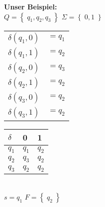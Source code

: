 \documentclass[
	final,
	a4paper,
	oneside,
	parskip=full,
	headings=standardclasses,
	headings=big,
	pointednumbers
]{scrartcl}
\def\myident{3cm}
\def\mysep{0pt}
\def\myrule{0pt}
\newenvironment{MyBsp}
[2]
{%
    \setlength{\fboxsep}{\mysep}
    \setlength{\fboxrule}{\myrule}
    \hspace{-\myident}\fbox{\begin{minipage}[t]{\myident}\hfill\textbf{#2}\enskip\,\end{minipage}}\begin{lrbox}{\mybox}\begin{minipage}[t]{\textwidth}\vspace{#1}
}
{%
    \end{minipage}\end{lrbox}\fbox{\usebox{\mybox}}
}
\begin{document}
    \begin{MyBsp}{-0.26cm}{Bsp.}
        \textbf{Unser Beispiel:} \\
        
        $Q = \left\{ \; q_1, q_2, q_3 \; \right\} $ \quad
        $\Sigma = \left\{ \; 0, 1 \; \right\} $ \\
        
        \hspace{-0.3cm}
        \begin{minipage}[t]{0.3\textwidth}
            \begin{tabular}{ll}
                $ \delta(q_1,0) $ & $= q_1$ \\
                $ \delta(q_1,1) $ & $= q_2$ \\
                \hline
                $ \delta(q_2,0) $ & $= q_3$ \\
                $ \delta(q_2,1) $ & $= q_2$ \\
                \hline
                $ \delta(q_3,0) $ & $= q_2$ \\
                $ \delta(q_3,1) $ & $= q_2$ \\
            \end{tabular}
        \end{minipage} \begin{minipage}[t]{0.3\textwidth}
            \begin{tabular}{l|ll}
                $ \delta $ & 0     & 1     \\
                \hline
                $ q_1 $    & $q_1$ & $q_2$ \\
                $ q_2 $    & $q_3$ & $q_2$ \\
                $ q_3 $    & $q_2$ & $q_2$
            \end{tabular}
        \end{minipage} \\
        
        $s = q_1 $ \quad
        $F = \left\{ \; q_2 \; \right\} $ \\
    \end{MyBsp}
    
\end{document}
